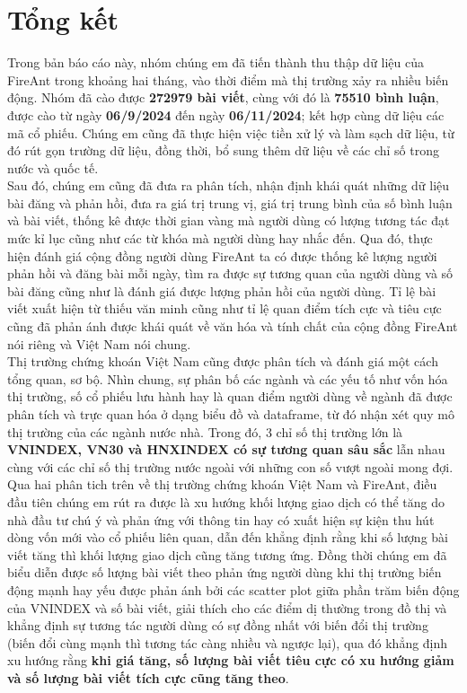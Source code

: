\chapter*{Tổng kết}

Trong bản báo cáo này, nhóm chúng em đã tiến thành thu thập dữ liệu của FireAnt trong khoảng hai tháng, vào thời điểm mà thị trường xảy ra nhiều biến động. Nhóm đã cào được \textbf{272979 bài viết}, cùng với đó là \textbf{75510 bình luận}, được cào từ ngày \textbf{06/9/2024} đến ngày \textbf{06/11/2024}; kết hợp cùng dữ liệu các mã cổ phiếu. Chúng em cũng đã thực hiện việc tiền xử lý và làm sạch dữ liệu, từ đó rút gọn trường dữ liệu, đồng thời, bổ sung thêm dữ liệu về các chỉ số trong nước và quốc tế.\\

Sau đó, chúng em cũng đã đưa ra phân tích, nhận định khái quát những dữ liệu bài đăng và phản hồi, đưa ra giá trị trung vị, giá trị trung bình của số bình luận và bài viết, thống kê được thời gian vàng mà người dùng có lượng tương tác đạt mức kỉ lục cũng như các từ khóa mà người dùng hay nhắc đến. Qua đó, thực hiện đánh giá cộng đồng người dùng FireAnt ta có được thống kê lượng người phản hồi và đăng bài mỗi ngày, tìm ra được sự tương quan của người dùng và số bài đăng cũng như là đánh giá được lượng phản hồi của người dùng. Tỉ lệ bài viết xuất hiện từ thiếu văn minh cũng như tỉ lệ quan điểm tích cực và tiêu cực cũng đã phản ánh được khái quát về văn hóa và tính chất của cộng đồng FireAnt nói riêng và Việt Nam nói chung.\\

Thị trường chứng khoán Việt Nam cũng được phân tích và đánh giá một cách tổng quan, sơ bộ. Nhìn chung, sự phân bố các ngành và các yếu tố như vốn hóa thị trường, số cổ phiếu lưu hành hay là quan điểm người dùng về ngành đã được phân tích và trực quan hóa ở dạng biểu đồ và dataframe, từ đó nhận xét quy mô thị trường của các ngành nước nhà. Trong đó, 3 chỉ số thị trường lớn là \textbf{VNINDEX, VN30 và HNXINDEX có sự tương quan sâu sắc} lẫn nhau cùng với các chỉ số thị trường nước ngoài với những con số vượt ngoài mong đợi.\\

Qua hai phân tich trên về thị trường chứng khoán Việt Nam và FireAnt, điều đầu tiên chúng em rút ra được là xu hướng khối lượng giao dịch có thể tăng do nhà đầu tư chú ý và phản ứng với thông tin hay có xuất hiện sự kiện thu hút dòng vốn mới vào cổ phiếu liên quan, dẫn đến khẳng định rằng khi số lượng bài viết tăng thì khối lượng giao dịch cũng tăng tương ứng. Đồng thời chúng em đã biểu diễn được số lượng bài viết theo phản ứng người dùng khi thị trường biến động mạnh hay yếu được phản ánh bởi các scatter plot giữa phần trăm biến động của VNINDEX và số bài viết, giải thích cho các điểm dị thường trong đồ thị và khẳng định sự tương tác người dùng có sự đồng nhất với biến đổi thị trường (biến đổi cùng mạnh thì tương tác càng nhiều và ngược lại), qua đó khẳng định xu hướng rằng \textbf{khi giá tăng, số lượng bài viết tiêu cực có xu hướng giảm và số lượng bài viết tích cực cũng tăng theo}.\\

